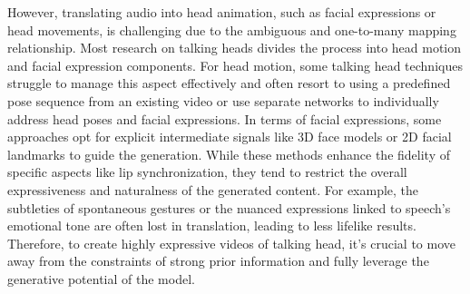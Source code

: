 \documentclass[runningheads]{llncs}
\begin{document}
However, translating audio into head animation, such as facial expressions or head movements, is challenging due to the ambiguous and one-to-many mapping relationship. 
Most research on talking heads divides the process into head motion and facial expression components\cite{sun2023vividtalk}. For head motion, some talking head techniques struggle to manage this aspect effectively and often resort to using a predefined pose sequence from an existing video\cite{wav2lip,Diff2Lip,syncnet} or use separate networks to individually address head poses and facial expressions\cite{sun2023vividtalk}. In terms of facial expressions, some approaches opt for explicit intermediate signals like 3D face models or 2D facial landmarks to guide the generation\cite{sun2023vividtalk,sadtalker}. 
While these methods enhance the fidelity of specific aspects like lip synchronization, they tend to restrict the overall expressiveness and naturalness of the generated content. For example, the subtleties of spontaneous gestures or the nuanced expressions linked to speech's emotional tone are often lost in translation, leading to less lifelike results.
Therefore, to create highly expressive videos of talking head, it's crucial to move away from the constraints of strong prior information and fully leverage the generative potential of the model.
\end{document}
